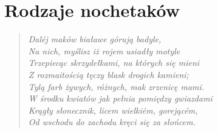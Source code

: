 \chapter{Rodzaje nochetaków}

\begin{quote}
\small
\textit{Daléj maków białawe górują badyle, \\
Na nich, myślisz iż rojem usiadły motyle \\
Trzepiecąc skrzydełkami, na których się mieni \\
Z rozmaitością tęczy blask drogich kamieni; \\
Tylą farb żywych, różnych, mak zrzenicę mami. \\
W środku kwiatów jak pełnia pomiędzy gwiazdami \\
Krągły słonecznik, licem wielkiém, gorejącém, \\
Od wschodu do zachodu kręci się za słońcem.} 
\end{quote}




